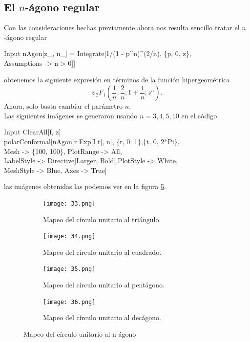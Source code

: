 \subsection{El $n$-ágono regular}
Con las consideraciones hechas previamente ahora nos resulta sencillo tratar el $n$-ágono regular
\begin{mmaCell}{Input}
	 nAgon[z_, n_] = Integrate[1/(1 - p^n)^(2/n), \{p, 0, z\},\\Assumptions -> n > 0]]
\end{mmaCell} 
obtenemos la siguiente expresión en términos de la función hipergeométrica
$$z \, _2F_1\left(\dfrac{1}{n},\dfrac{2}{n};1+\dfrac{1}{n};z^n\right).$$
Ahora, solo basta cambiar el parámetro $n$.\\
Las siguientes imágenes se generaron usando $n=3,4,5,10$ en el código
\begin{mmaCell}{Input}
	 ClearAll[f, z]\\polarConformal[nAgon[r Exp[I t], n], \{r, 0, 1\},\{t, 0, 2*Pi\},\\Mesh -> \{100, 100\}, PlotRange -> All,\\LabelStyle -> Directive[Larger, Bold],PlotStyle -> White,\\MeshStyle -> Blue, Axes -> True]
\end{mmaCell}
las imágenes obtenidas las podemos ver en la figura \ref{fig:Mapeo del círculo unitario al n-ágono}. \newpage
\begin{figure}[htbp]
	\centering
	\begin{subfigure}{0.45\textwidth}
		\texttt{[image: 33.png]}
		\caption{Mapeo del círculo unitario al triángulo.}
		\label{fig:Mapeo del círculo unitario al triángulo.}
	\end{subfigure}
	\begin{subfigure}{0.45\textwidth}
		\texttt{[image: 34.png]}
		\caption{Mapeo del círculo unitario al cuadrado.}
		\label{fig:Mapeo del círculo unitario al cuadrado}
	\end{subfigure}
	
	\begin{subfigure}{0.45\textwidth}
		\texttt{[image: 35.png]}
		\caption{Mapeo del círculo unitario al pentágono.}
		\label{fig:Mapeo del círculo unitario al pentágono}
	\end{subfigure}
	\begin{subfigure}{0.45\textwidth}
		\texttt{[image: 36.png]}
		\caption{Mapeo del círculo unitario al decágono.}
		\label{fig:Mapeo del círculo unitario al decágono}
	\end{subfigure}
	\caption{Mapeo del círculo unitario al n-ágono}
	\label{fig:Mapeo del círculo unitario al n-ágono}
\end{figure}




